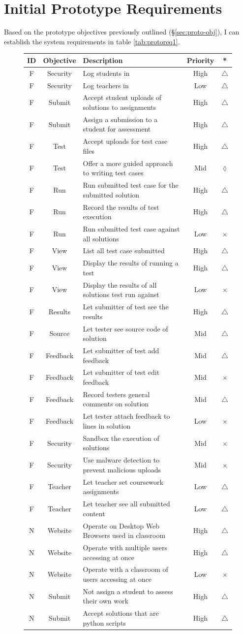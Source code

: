 \documentclass[a4paper,11pt]{report}
\newcounter{FunCount}
\newcounter{NFunCount}
\newcommand{\freq}[4]{\addtocounter{FunCount}{1}F\arabic{FunCount} & #1 & #2 & #3 & #4\\}
\newcommand{\nfreq}[4]{\addtocounter{NFunCount}{1}N\arabic{NFunCount} & #1 & #2 & #3 & #4\\}
\begin{document}
\section{Initial Prototype Requirements}
\label{sec:req1}
Based on the  prototype objectives previously outlined (\S\ref{sec:proto-obj}), I can establish the system requirements in table \ref{tab:protoreq1}.\par
\begin{figure}
\begin{longtable}{ccl@{}cc}
\textbf{ID} & \textbf{Objective} & \textbf{Description} & \textbf{Priority} & \textbf{*} \\\hline
\freq{Security}{Log students in}{High}{$\triangle$}
\freq{Security}{Log teachers in}{Low}{$\triangle$}
\freq{Submit}{Accept student uploads of solutions to assignments}{High}{$\triangle$}
\freq{Submit}{Assign a submission to a student for assessment}{High}{$\triangle$}
\freq{Test}{Accept uploads for test case files}{High}{$\triangle$}
\freq{Test}{Offer a more guided approach to writing test cases}{Mid}{$\lozenge$}
\freq{Run}{Run submitted test case for the submitted solution}{High}{$\triangle$}
\freq{Run}{Record the results of test execution}{High}{$\triangle$}
\freq{Run}{Run submitted test case against all solutions}{Low}{$\times$}
\freq{View}{List all test case submitted}{High}{$\triangle$}
\freq{View}{Display the results of running a test}{High}{$\triangle$}
\freq{View}{Display the results of all solutions test run against}{Low}{$\times$}
\freq{Results}{Let submitter of test see the results}{High}{$\triangle$}
\freq{Source}{Let tester see source code of solution}{Mid}{$\triangle$}
\freq{Feedback}{Let submitter of test add feedback}{Mid}{$\triangle$}
\freq{Feedback}{Let submitter of test edit feedback}{Mid}{$\times$}
\freq{Feedback}{Record testers general comments on solution}{Mid}{$\triangle$}
\freq{Feedback}{Let tester attach feedback to lines in solution}{Low}{$\times$}
\freq{Security}{Sandbox the execution of solutions}{Mid}{$\times$}
\freq{Security}{Use malware detection to prevent malicious uploads}{Mid}{$\times$}
\freq{Teacher}{Let teacher set coursework assignments}{Low}{$\triangle$}
\freq{Teacher}{Let teacher see all submitted content}{Low}{$\triangle$}
\nfreq{Website}{Operate on Desktop Web Browsers used in classroom}{High}{$\triangle$}
\nfreq{Website}{Operate with multiple users accessing at once}{High}{$\triangle$}
\nfreq{Website}{Operate with a classroom of users accessing at once}{Low}{$\times$}
\nfreq{Submit}{Not assign a student to assess their own work}{High}{$\triangle$}
\nfreq{Submit}{Accept solutions that are python scripts}{High}{$\triangle$}

\end{longtable}
\end{figure}
\end{document}
